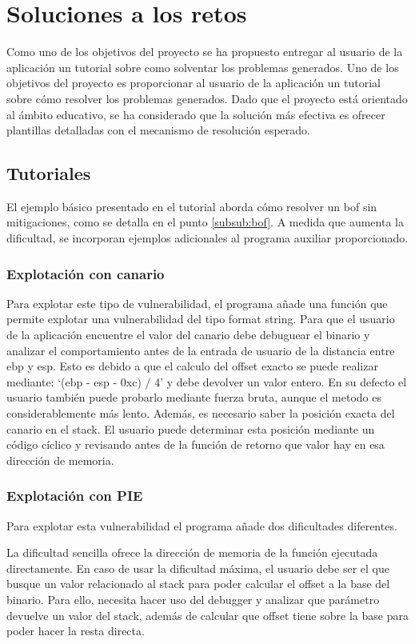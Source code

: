 \section{Soluciones a los retos}
Como uno de los objetivos del proyecto se ha propuesto entregar al usuario de la aplicación un tutorial sobre como solventar los problemas generados.
Uno de los objetivos del proyecto es proporcionar al usuario de la aplicación un tutorial sobre cómo resolver los problemas generados.
Dado que el proyecto está orientado al ámbito educativo, se ha considerado que la solución más efectiva es ofrecer plantillas detalladas con el mecanismo de resolución esperado.
\subsection{Tutoriales}
El ejemplo básico presentado en el tutorial aborda cómo resolver un \acrshort{bof} sin mitigaciones, como se detalla en el punto \ref{subsub:bof}.
A medida que aumenta la dificultad, se incorporan ejemplos adicionales al programa auxiliar proporcionado.
\subsubsection{Explotación con canario}
Para explotar este tipo de vulnerabilidad, el programa añade una función que permite explotar una vulnerabilidad del tipo format string.
Para que el usuario de la aplicación encuentre el valor del canario debe debuguear el binario y analizar el comportamiento antes de la entrada de usuario de la distancia entre \acrshort{ebp} y \acrshort{esp}.
Esto es debido a que el calculo del offset exacto se puede realizar mediante:
`(\acrshort{ebp} - \acrshort{esp} - 0xc) / 4' y debe devolver un valor entero.
En su defecto el usuario también puede probarlo mediante fuerza bruta, aunque el metodo es considerablemente más lento.
Además, es necesario saber la posición exacta del canario en el stack.
El usuario puede determinar esta posición mediante un código cíclico y revisando antes de la función de retorno que valor hay en esa dirección de memoria.

\subsubsection{Explotación con PIE}
Para explotar esta vulnerabilidad el programa añade dos dificultades diferentes.

La dificultad sencilla ofrece la dirección de memoria de la función ejecutada directamente.
En caso de usar la dificultad máxima, el usuario debe ser el que busque un valor relacionado al stack para poder calcular el offset a la base del binario.
Para ello, necesita hacer uso del debugger y analizar que parámetro devuelve un valor del stack, además de calcular que offset tiene sobre la base para poder hacer la resta directa.

